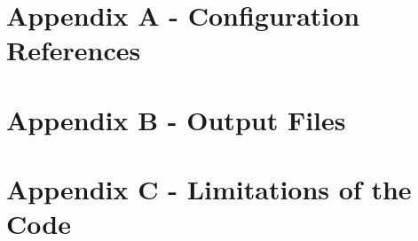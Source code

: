\newpage
\section{Appendix A - Configuration References}

\section{Appendix B - Output Files}

\section{Appendix C - Limitations of the Code}
